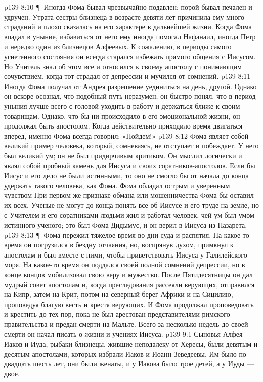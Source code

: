 \vs p139 8:10 \P\ Иногда Фома бывал чрезвычайно подавлен; порой бывал печален и удручен. Утрата сестры\hyp{}близнеца в возрасте девяти лет причинила ему много страданий и плохо сказалась на его характере в дальнейшей жизни. Когда Фома впадал в уныние, избавиться от него ему иногда помогал Нафанаил, иногда Петр и нередко один из близнецов Алфеевых. К сожалению, в периоды самого угнетенного состояния он всегда старался избежать прямого общения с Иисусом. Но Учитель знал об этом все и относился к своему апостолу с понимающим сочувствием, когда тот страдал от депрессии и мучился от сомнений.
\vs p139 8:11 Иногда Фома получал от Андрея разрешение уединиться на день, другой. Однако он вскоре осознал, что подобный путь неразумен; он быстро понял, что в период уныния лучше всего с головой уходить в работу и держаться ближе к своим товарищам. Однако, что бы ни происходило в его эмоциональной жизни, он продолжал быть апостолом. Когда действительно приходило время двигаться вперед, именно Фома всегда говорил: «Пойдем!»
\vs p139 8:12 Фома являет собой великий пример человека, который, сомневаясь, не отступает и побеждает. У него был великий ум; он не был придирчивым критиком. Он мыслил логически и являл собой пробный камень для Иисуса и своих соратников\hyp{}апостолов. Если бы Иисус и его дело не были истинными, то оно не смогло бы от начала до конца удержать такого человека, как Фома. Фома обладал острым и уверенным чувством  При первом же признаке обмана или мошенничества Фома бы оставил их всех. Ученые не могут до конца понять все об Иисусе и его труде на земле, но с Учителем и его соратниками\hyp{}людьми жил и работал человек, чей ум был умом истинного ученого; это был Фома Дидымус, и он верил в Иисуса из Назарета.
\vs p139 8:13 \P\ Фома пережил тяжелое время во дни суда и распятия. На какое\hyp{}то время он погрузился в бездну отчаяния, но, воспрянув духом, примкнул к апостолам и был вместе с ними, чтобы приветствовать Иисуса у Галилейского моря. На какое\hyp{}то время он поддался своей полной сомнений депрессии, но в конце концов мобилизовал свою веру и мужество. После Пятидесятницы он дал мудрый совет апостолам и, когда преследования рассеяли верующих, отправился на Кипр, затем на Крит, потом на северный берег Африки и на Сицилию, проповедуя благую весть и крестя верующих. И Фома продолжал проповедовать и крестить до тех пор, пока не был арестован представителями римского правительства и предан смерти на Мальте. Всего за несколько недель до своей смерти он начал писать о жизни и учениях Иисуса.
\vs p139 9:1 Сыновья Алфея Иаков и Иуда, рыбаки\hyp{}близнецы, жившие неподалеку от Хересы, были девятым и десятым апостолами, которых избрали Иаков и Иоанн Зеведеевы. Им было по двадцать шесть лет, они были женаты, и у Иакова было трое детей, а у Иуды --- двое.
